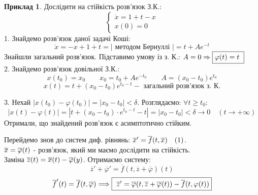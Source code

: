 \documentclass[14pt,a4paper]{scrartcl}
\theoremstyle{definition}
\newtheorem*{example}{Приклад}
\theoremstyle{remark}
\theoremstyle{definition}
\theoremstyle{definition}
\begin{document}
\begin{example}
    Дослідити на стійкість розв'язок З.К.:
    $$
    \begin{cases}
        \dot{x} = 1 + t - x \\
        x(0) = 0
    \end{cases}
    $$
    1. Знайдемо розв'язок даної задачі Коші:
    $$
    \dot{x} = - x + 1 + t = \left| \text{ методом Бернуллі } \right| = t + Ae^{-t}
    $$
    Знайшли загальний розв'язок. Підставимо умову із з. К.: $ A = 0 \Rightarrow \fbox {$\varphi(t) = t$ }$\\
    2. Знайдемо розв'язок довільної З.К.:
    $$
    x(t_0) = x_0 \qquad x_0 = t_0 + Ae^{-t_0} \qquad A = (x_0 - t_0) e^{t_0}
    $$
    $$
    x(t) = t + (x_0 - t_0) e^{t_0 - t} - \text{ загальний розв'язок з. К.}
    $$

    3. Нехай $ \left|  x(t_0) - \varphi(t_0)  \right| = \left| x_0 - t_0 \right|  < \delta $. Розглядаємо: $ \forall t \geq t_0 :$
    $$
    \left| x(t) - \varphi(t) \right| = \left| t + (x_0 - t_0) \cdot e^{ t_0 - t} - t \right| =
     \left| x_0 - t_0 \right|< \delta  \to 0  \quad (t \to + \infty)
    $$
    Отримали, що знайдений розв'язок є асимптотично стійким.
\end{example}
Перейдемо знов до систем диф. рівнянь: $ \overline{x}' = \overline{f} (t, \overline{x})  \quad (1)$.\\
$\overline{x} = \overline{\varphi} (t)$ - розв'язок, який ми маємо дослідити на стійкість.\\
Заміна $ \overline{z} (t) = \overline{x} (t)  - \overline{\varphi} (y) $. Отримаємо систему:
$$ \overline{z}' + \overline{\varphi}'  = \overline{f} (t, \overline{z}+ \overline{\varphi})(t)$$
$$
\overline{f}' (t) = \overline{f} (t, \overline{\varphi})  \Longrightarrow \fbox{ $ \overline{z} ' = \overline{\varphi} (t, \overline{z} + \overline{\varphi} (t)) - \overline{f} ( t, \varphi(t)) $}
$$


\end{document}
